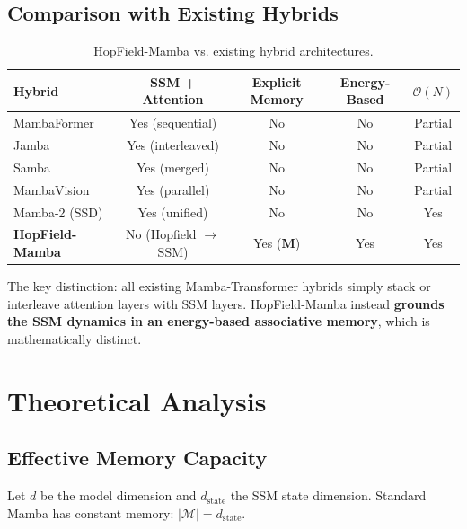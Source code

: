 \documentclass[11pt,a4paper]{article}
\numberwithin{equation}{section}
\begin{document}
\subsection{Comparison with Existing Hybrids}

\begin{table}[H]
\centering
\caption{HopField-Mamba vs. existing hybrid architectures.}
\label{tab:comparison}
\small
\begin{tabular}{lcccc}
\toprule
\textbf{Hybrid} & SSM + \newline Attention & Explicit \newline Memory & Energy-\newline Based & $\mathcal{O}(N)$ \\
\midrule
MambaFormer & Yes (sequential) & No & No & Partial \\
Jamba \cite{lieber2024jamba} & Yes (interleaved) & No & No & Partial \\
Samba \cite{ren2024samba} & Yes (merged) & No & No & Partial \\
MambaVision \cite{hatamizadeh2025mamba} & Yes (parallel) & No & No & Partial \\
Mamba-2 (SSD) & Yes (unified) & No & No & Yes \\
\textbf{HopField-Mamba} & No (Hopfield $\to$ SSM) & Yes ($\bm{M}$) & Yes & Yes \\
\bottomrule
\end{tabular}
\end{table}

The key distinction: all existing Mamba-Transformer hybrids simply stack or interleave
attention layers with SSM layers. HopField-Mamba instead \textbf{grounds the SSM dynamics
in an energy-based associative memory}, which is mathematically distinct.

\section{Theoretical Analysis}
\label{sec:theory}

\subsection{Effective Memory Capacity}

Let $d$ be the model dimension and $d_{\text{state}}$ the SSM state dimension.
Standard Mamba has constant memory: $|\mathcal{M}| = d_{\text{state}}$.
\end{document}
